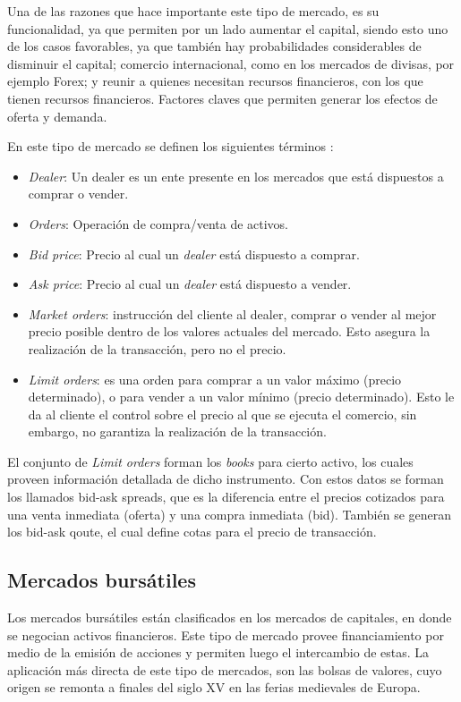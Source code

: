 Una de las razones que hace importante este tipo de mercado, es su funcionalidad, ya que permiten por un lado aumentar el capital, siendo esto uno 
de los casos favorables, ya que también hay probabilidades considerables de disminuir el capital; comercio internacional, como en los mercados de 
divisas, por ejemplo Forex; y reunir a quienes necesitan recursos financieros, con los que tienen recursos financieros. Factores claves
que permiten generar los efectos de oferta y demanda.

En este tipo de mercado se definen los siguientes términos \cite{nevmyvaka2003electronic}:
\begin{itemize}
	\item \emph{Dealer}: Un dealer es un ente presente en los mercados que está dispuestos a comprar o vender.
	\item \emph{Orders}: Operación de compra/venta de activos.
	\item \emph{Bid price}: Precio al cual un \emph{dealer} está dispuesto a comprar.
	\item \emph{Ask price}: Precio al cual un \emph{dealer} está dispuesto a vender.
	\item \emph{Market orders}: instrucción del cliente al dealer, comprar o vender al mejor precio posible dentro de los valores actuales del mercado.
		Esto asegura la realización de la transacción, pero no el precio.
	\item \emph{Limit orders}: es una orden para comprar a un valor máximo (precio determinado), o para vender a un valor mínimo (precio determinado).
		Esto le da al cliente el control sobre el precio al que se ejecuta el comercio, sin embargo, no garantiza la realización de la transacción.
\end{itemize}

El conjunto de \emph{Limit orders} forman los \emph{books} para cierto activo, los cuales proveen información detallada de dicho instrumento. Con estos datos
se forman los llamados bid-ask spreads, que es la diferencia entre el precios cotizados para una venta inmediata (oferta) y una compra inmediata (bid). 
También se generan los bid-ask qoute, el cual define cotas para el precio de transacción.

\subsection{Mercados bursátiles}
Los mercados bursátiles están clasificados en los mercados de capitales, en donde se negocian activos financieros. Este tipo de mercado provee financiamiento
por medio de la emisión de acciones y permiten luego el intercambio de estas. La aplicación más directa de este tipo de mercados, son las bolsas de valores, cuyo
origen se remonta a finales del siglo XV en las ferias medievales de Europa.


